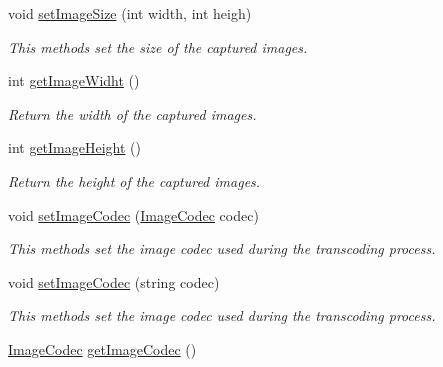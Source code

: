 \begin{DoxyCompactItemize}
void \hyperlink{classbr_1_1ufscar_1_1lince_1_1xpta_1_1streaming_1_1ImageShotter_ab5aeb865dbfd30d615678be2ef0b614b}{setImageSize} (int width, int heigh)
\begin{DoxyCompactList}\small\item\em This methods set the size of the captured images. \item\end{DoxyCompactList}\item 
int \hyperlink{classbr_1_1ufscar_1_1lince_1_1xpta_1_1streaming_1_1ImageShotter_afe99a0aec363646190f8f416f6ac7139}{getImageWidht} ()
\begin{DoxyCompactList}\small\item\em Return the width of the captured images. \item\end{DoxyCompactList}\item 
int \hyperlink{classbr_1_1ufscar_1_1lince_1_1xpta_1_1streaming_1_1ImageShotter_a792e9f6fef3a213c993b5707ad0ccfdf}{getImageHeight} ()
\begin{DoxyCompactList}\small\item\em Return the height of the captured images. \item\end{DoxyCompactList}\item 
void \hyperlink{classbr_1_1ufscar_1_1lince_1_1xpta_1_1streaming_1_1ImageShotter_aaf80d398d7f9a939760cf00c02f576d2}{setImageCodec} (\hyperlink{namespacebr_1_1ufscar_1_1lince_1_1xpta_1_1streaming_a2b9d08b18e23472bf55daa690c56169e}{ImageCodec} codec)
\begin{DoxyCompactList}\small\item\em This methods set the image codec used during the transcoding process. \item\end{DoxyCompactList}\item 
void \hyperlink{classbr_1_1ufscar_1_1lince_1_1xpta_1_1streaming_1_1ImageShotter_a574f65cd5a37b49817c2298b25f9ac45}{setImageCodec} (string codec)
\begin{DoxyCompactList}\small\item\em This methods set the image codec used during the transcoding process. \item\end{DoxyCompactList}\item 
\hyperlink{namespacebr_1_1ufscar_1_1lince_1_1xpta_1_1streaming_a2b9d08b18e23472bf55daa690c56169e}{ImageCodec} \hyperlink{classbr_1_1ufscar_1_1lince_1_1xpta_1_1streaming_1_1ImageShotter_ab22098b501aacf71e98ec633b0372977}{getImageCodec} ()

\end{DoxyCompactItemize}
